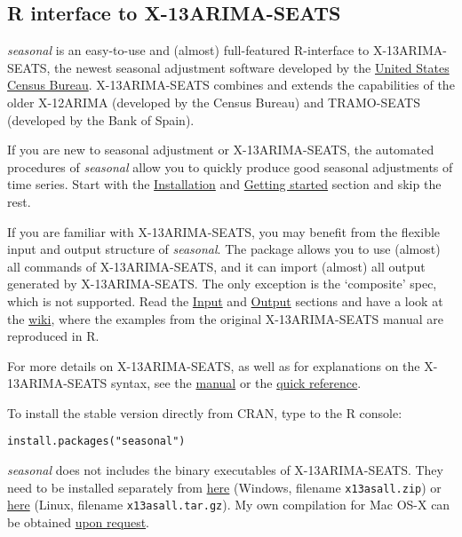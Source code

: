 \subsection{R interface to
X-13ARIMA-SEATS}\label{r-interface-to-x-13arima-seats}

\emph{seasonal} is an easy-to-use and (almost) full-featured R-interface
to X-13ARIMA-SEATS, the newest seasonal adjustment software developed by
the \href{http://www.census.gov/srd/www/x13as/}{United States Census
Bureau}. X-13ARIMA-SEATS combines and extends the capabilities of the
older X-12ARIMA (developed by the Census Bureau) and TRAMO-SEATS
(developed by the Bank of Spain).

If you are new to seasonal adjustment or X-13ARIMA-SEATS, the automated
procedures of \emph{seasonal} allow you to quickly produce good seasonal
adjustments of time series. Start with the
\hyperref[installation]{Installation} and
\hyperref[getting-started]{Getting started} section and skip the rest.

If you are familiar with X-13ARIMA-SEATS, you may benefit from the
flexible input and output structure of \emph{seasonal}. The package
allows you to use (almost) all commands of X-13ARIMA-SEATS, and it can
import (almost) all output generated by X-13ARIMA-SEATS. The only
exception is the `composite' spec, which is not supported. Read the
\hyperref[input]{Input} and \hyperref[output]{Output} sections and have
a look at the
\href{https://github.com/christophsax/seasonal/wiki/Examples-of-X-13ARIMA-SEATS-in-R}{wiki},
where the examples from the original X-13ARIMA-SEATS manual are
reproduced in R.

For more details on X-13ARIMA-SEATS, as well as for explanations on the
X-13ARIMA-SEATS syntax, see the
\href{http://www.census.gov/ts/x13as/docX13AS.pdf}{manual} or the
\href{http://www.census.gov/ts/x13as/pc/qrefX13ASpc.pdf}{quick
reference}.


To install the stable version directly from CRAN, type to the R console:

\begin{verbatim}
install.packages("seasonal")
\end{verbatim}

\emph{seasonal} does not includes the binary executables of
X-13ARIMA-SEATS. They need to be installed separately from
\href{http://www.census.gov/srd/www/x13as/x13down_pc.html}{here}
(Windows, filename \texttt{x13asall.zip}) or
\href{http://www.census.gov/srd/www/x13as/x13down_unix.html}{here}
(Linux, filename \texttt{x13asall.tar.gz}). My own compilation for Mac
OS-X can be obtained \href{mailto:christoph.sax@gmail.com}{upon
request}.

